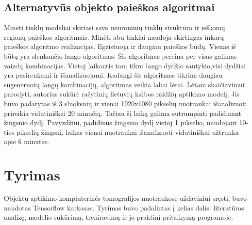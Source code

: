 \documentclass{VUMIFInfKursinis}
\begin{document}
\subsection{Alternatyvūs objekto paieškos algoritmai}
\par
Minėti tinklų modeliai skiriasi savo neuroninių tinklų struktūra ir ieškomų regionų
paieškos algoritmais. Minėti abu tinklai naudoja skirtingas inkarų paieškos algoritmo
realizacijas. Egzistuoja ir daugiau paieškos būdų. Vienas iš būtų yra slenkančio lango
algoritmas. Šis algoritmas pereina per visas galimas vaizdų kombinacijas. Vietoj
laikantis tam tikro lango dydžio santykio,visi dydžiai yra pasirenkami ir išanalizuojami.
Kadangi šis algoritmas tikrina daugiau sugeneruotų langų kombinacijų, algoritmas veikia labai lėtai.
Lėtam skaičiavimui parodyti, autorius sukūrė rašytinių lietuvių kalbos raidžių aptikimo modelį. Jis buvo padarytas iš 3 sluoksnių
ir vienai 1920x1080 pikselių nuotraukai išanalizuoti prireikia vidutiniškai 20 minučių. Tačiau
šį laiką galima sutrumpinti padidinant žingsnio dydį. Pavyzdžiui, padidinus žingsnio dydį vietoj
1 pikselio, naudojant 10-ties pikselių žingsnį, laikas vienai nuotraukai išanalizuoti
vidutiniškai užtrunka apie 6 minutes.

\section{Tyrimas}
\par
Objektų aptikimo kompiuterinės tomografijos nuotraukose uždaviniui sręsti,
buvo naudotas Tensorflow karkasas.
Tyrimas buvo padalintas į kelias dalis: literatūros analizę, modelio
sukūrimą, treniravimą ir jo praktinį pritaikymą programoje.
\end{document}
